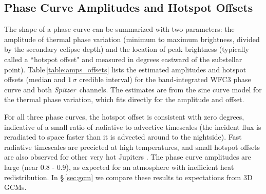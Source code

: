 \documentclass[twocolumn]{aastex61}
\newcommand{\project}[1]{\textsl{#1}}
\newcommand{\Spitzer}{\project{Spitzer}}
\begin{document}
\subsection{Phase Curve Amplitudes and Hotspot Offsets}
The shape of a phase curve can be summarized with two parameters: the amplitude of thermal phase variation (minimum to maximum brightness, divided by the secondary eclipse depth) and the location of peak brightness (typically called a ``hotspot offset" and measured in degrees eastward of the substellar point).  Table\,\ref{table:amps_offsets} lists the estimated amplitudes and hotspot offsets (median and $1\,\sigma$ credible interval) for the band-integrated WFC3 phase curve and both \Spitzer\ channels. The estimates are from the sine curve model for the thermal phase variation, which fits directly for the amplitude and offset. 

For all three phase curves, the hotspot offset is consistent with zero degrees, indicative of a small ratio of radiative to advective timescales (the incident flux is reradiated to space faster than it is advected around to the nightside). Fast radiative timescales are precicted at high temperatures, and small hotspot offsets are also observed for other very hot Jupiters \citep{perez13, komacek16, komacek17}.  The phase curve amplitudes are large (near 0.8 - 0.9), as expected for an atmosphere with inefficient heat redistribution. In \S\,\ref{sec:gcm} we compare these results to expectations from 3D GCMs.

\end{document}
